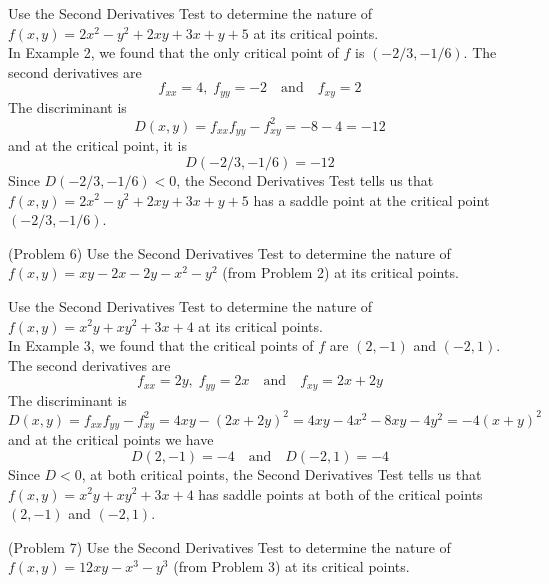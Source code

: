 \documentclass[handout]{ximera}
\begin{document}
\begin{example}[Example 6]
Use the Second Derivatives Test to determine the nature of $f(x,y) = 2x^2 - y^2 +2xy + 3x + y+ 5$ at its critical points.\\
In Example 2, we found that the only critical point of $f$ is $(-2/3,-1/6)$.
The second derivatives are
\[
f_{xx} = 4,\; f_{yy} = -2 \quad \text{and} \quad f_{xy} = 2
\]
The discriminant is
\[
D(x,y) = f_{xx} f_{yy} - f_{xy}^2 = -8 -4 = -12
\]
and at the critical point, it is
\[
D(-2/3,-1/6) = -12
\]
Since $D(-2/3,-1/6) < 0$, the Second Derivatives Test tells us that $f(x,y) = 2x^2 - y^2 +2xy + 3x + y+ 5$
has a saddle point at the critical point $(-2/3,-1/6)$.
\end{example}

\begin{problem}(Problem 6)
Use the Second Derivatives Test to determine the nature of $f(x,y) = xy - 2x-2y-x^2 - y^2$ (from Problem 2)
 at its critical points.\\
\end{problem}


\begin{example}[Example 7]
Use the Second Derivatives Test to determine the nature of  $f(x,y) = x^2y +xy^2 +3x + 4$ at its critical points.\\
In Example 3, we found that the critical points of $f$ are $(2,-1)$ and $(-2, 1)$.
The second derivatives are
\[
f_{xx} = 2y,\; f_{yy} = 2x \quad \text{and} \quad f_{xy} = 2x + 2y
\]
The discriminant is
\[
D(x,y) = f_{xx} f_{yy} - f_{xy}^2 = 4xy - (2x+2y)^2 = 4xy - 4x^2 - 8xy - 4y^2 = -4(x+y)^2
\]
and at the critical points we have
\[
D(2, -1) = -4 \quad \text{and} \quad D(-2, 1) = -4
\]
Since $D < 0$, at both critical points, the Second Derivatives Test tells us that $f(x,y) = x^2y +xy^2 +3x + 4$
has saddle points at both of the critical points $(2,-1)$ and $(-2, 1)$.
\end{example}


\begin{problem}(Problem 7)
Use the Second Derivatives Test to determine the nature of  $f(x,y) = 12xy - x^3 - y^3$ 
(from Problem 3) at its critical points.\\
\end{problem}
\end{document}
